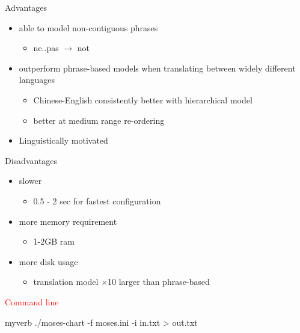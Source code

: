 \documentclass[landscape]{uedslides2C}
\begin{document}
{\small \begin{multicols}{2}

Advantages
\begin{itemize}
\item able to model non-contiguous phrases
	\begin{itemize}
	\item ne..pas $\rightarrow$ not
	\end{itemize}
\item outperform phrase-based models when translating between widely different languages
	\begin{itemize}
	\item Chinese-English consistently better with hierarchical model 
	\item better at medium range re-ordering
	\end{itemize}
\item Linguistically motivated 
\end{itemize}

\columnbreak

Disadvantages
\begin{itemize}
\item slower
	\begin{itemize}
	\item 0.5 - 2 sec for fastest configuration
	\end{itemize}
\item more memory requirement
	\begin{itemize}
	\item 1-2GB ram
	\end{itemize}
\item more disk usage
	\begin{itemize}
	\item translation model $\times$10 larger than phrase-based
	\end{itemize}
\end{itemize}

\end{multicols}
}
\begin{center}
\textcolor{red}{Command line} 
\begin{SaveVerbatim}{myverb}
./moses-chart -f moses.ini -i in.txt > out.txt
\end{SaveVerbatim}
\colorbox{gray}{}
\end{center}
\end{document}

